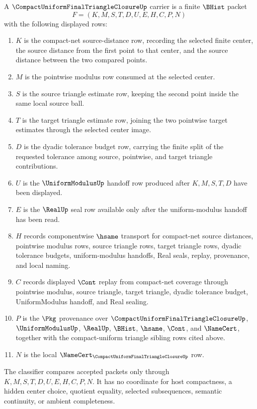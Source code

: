 \begin{definition}
\label{def:compact-uniform-final-triangle-closure-carrier}
A $\CompactUniformFinalTriangleClosureUp$ carrier is a finite $\BHist$ packet
$$
F=(K,M,S,T,D,U,E,H,C,P,N)
$$
with the following displayed rows:
\begin{enumerate}
\item $K$ is the compact-net source-distance row, recording the selected finite center, the source distance from the first point to that center, and the source distance between the two compared points.
\item $M$ is the pointwise modulus row consumed at the selected center.
\item $S$ is the source triangle estimate row, keeping the second point inside the same local source ball.
\item $T$ is the target triangle estimate row, joining the two pointwise target estimates through the selected center image.
\item $D$ is the dyadic tolerance budget row, carrying the finite split of the requested tolerance among source, pointwise, and target triangle contributions.
\item $U$ is the $\UniformModulusUp$ handoff row produced after $K,M,S,T,D$ have been displayed.
\item $E$ is the $\RealUp$ seal row available only after the uniform-modulus handoff has been read.
\item $H$ records componentwise $\hsame$ transport for compact-net source distances, pointwise modulus rows, source triangle rows, target triangle rows, dyadic tolerance budgets, uniform-modulus handoffs, Real seals, replay, provenance, and local naming.
\item $C$ records displayed $\Cont$ replay from compact-net coverage through pointwise modulus, source triangle, target triangle, dyadic tolerance budget, UniformModulus handoff, and Real sealing.
\item $P$ is the $\Pkg$ provenance over $\CompactUniformFinalTriangleClosureUp$, $\UniformModulusUp$, $\RealUp$, $\BHist$, $\hsame$, $\Cont$, and $\NameCert$, together with the compact-uniform triangle sibling rows cited above.
\item $N$ is the local $\NameCert_{\CompactUniformFinalTriangleClosureUp}$ row.
\end{enumerate}
The classifier compares accepted packets only through $K,M,S,T,D,U,E,H,C,P,N$. It has no coordinate for host compactness, a hidden center choice, quotient equality, selected subsequences, semantic continuity, or ambient completeness.
\end{definition}


